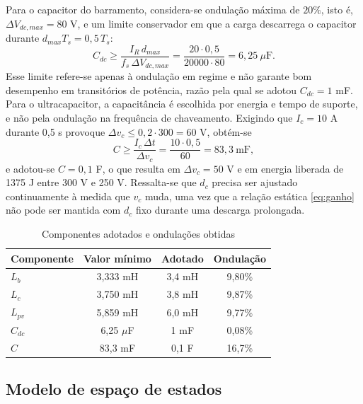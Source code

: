 Para o capacitor do barramento, considera-se ondulação máxima de $20\%$, isto é, $\Delta V_{dc,max}=80$ V, e um limite conservador em que a carga descarrega o capacitor durante $d_{max}T_s=0{,}5\,T_s$:
\begin{equation}
C_{dc}\ge\frac{I_R\,d_{max}}{f_s\,\Delta V_{dc,max}}=\frac{20\cdot0{,}5}{20000\cdot80}=6{,}25\ \mu\text{F}.
\end{equation}
Esse limite refere-se apenas à ondulação em regime e não garante bom desempenho em transitórios de potência, razão pela qual se adotou $C_{dc}=1$ mF. Para o ultracapacitor, a capacitância é escolhida por energia e tempo de suporte, e não pela ondulação na frequência de chaveamento. Exigindo que $I_c=10$ A durante 0,5 s provoque $\Delta v_c\le0{,}2\cdot300=60$ V, obtém-se
\begin{equation}
C\ge\frac{I_c\,\Delta t}{\Delta v_c}=\frac{10\cdot0{,}5}{60}=83{,}3\ \text{mF},
\end{equation}
e adotou-se $C=0{,}1$ F, o que resulta em $\Delta v_c=50$ V e em energia liberada de 1375 J entre 300 V e 250 V. Ressalta-se que $d_c$ precisa ser ajustado continuamente à medida que $v_c$ muda, uma vez que a relação estática \eqref{eq:ganho} não pode ser mantida com $d_c$ fixo durante uma descarga prolongada.

\begin{table}[H]
\centering
\caption{Componentes adotados e ondulações obtidas}
\label{tab:dim}
\small
\begin{tabular}{lccc}
\toprule
Componente & Valor mínimo & Adotado & Ondulação \\
\midrule
$L_b$ & 3,333 mH & 3,4 mH & 9,80\% \\
$L_c$ & 3,750 mH & 3,8 mH & 9,87\% \\
$L_{pv}$ & 5,859 mH & 6,0 mH & 9,77\% \\
$C_{dc}$ & 6,25 $\mu$F & 1 mF & 0,08\% \\
$C$ & 83,3 mF & 0,1 F & 16,7\% \\
\bottomrule
\end{tabular}
\end{table}

\subsection{Modelo de espaço de estados}

